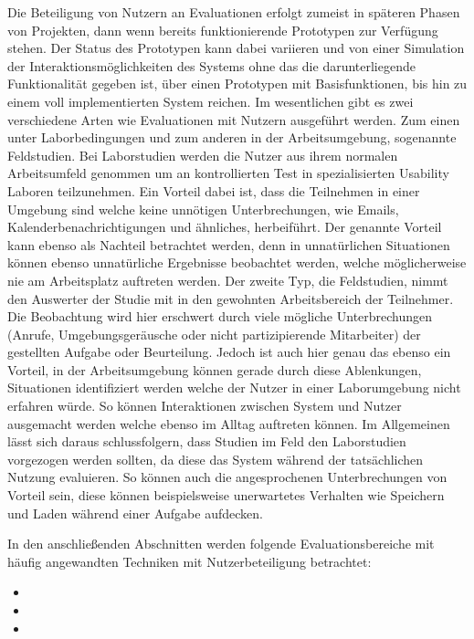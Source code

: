 \documentclass[draft=false
              ,paper=a4
              ,twoside=false
              ,fontsize=11pt
              ,headsepline
              ,BCOR10mm
              ,DIV11
              ]{scrbook}
\begin{document}
Die Beteiligung von Nutzern an Evaluationen erfolgt zumeist in späteren Phasen von Projekten, dann wenn bereits funktionierende Prototypen zur Verfügung stehen. Der Status des Prototypen kann dabei variieren und von einer Simulation der Interaktionsmöglichkeiten des Systems ohne das die darunterliegende Funktionalität gegeben ist, über einen Prototypen mit Basisfunktionen, bis hin zu einem voll implementierten System reichen.
Im wesentlichen gibt es zwei verschiedene Arten wie Evaluationen mit Nutzern ausgeführt werden. Zum einen unter Laborbedingungen und zum anderen in der Arbeitsumgebung, sogenannte Feldstudien. Bei Laborstudien werden die Nutzer aus ihrem normalen Arbeitsumfeld genommen um an kontrollierten Test in spezialisierten Usability Laboren teilzunehmen. Ein Vorteil dabei ist, dass die Teilnehmen in einer Umgebung sind welche keine unnötigen Unterbrechungen, wie Emails, Kalenderbenachrichtigungen und ähnliches, herbeiführt. Der genannte Vorteil kann ebenso als Nachteil betrachtet werden, denn in unnatürlichen Situationen können ebenso unnatürliche Ergebnisse beobachtet werden, welche möglicherweise nie am Arbeitsplatz auftreten werden.
Der zweite Typ, die Feldstudien, nimmt den Auswerter der Studie mit in den gewohnten Arbeitsbereich der Teilnehmer. Die Beobachtung wird hier erschwert durch viele mögliche Unterbrechungen (Anrufe, Umgebungsgeräusche oder nicht partizipierende Mitarbeiter) der gestellten Aufgabe oder Beurteilung. Jedoch ist auch hier genau das ebenso ein Vorteil, in der Arbeitsumgebung können gerade durch diese Ablenkungen, Situationen identifiziert werden welche der Nutzer in einer Laborumgebung nicht erfahren würde. So können Interaktionen zwischen System und Nutzer ausgemacht werden welche ebenso im Alltag auftreten können. 
Im Allgemeinen lässt sich daraus schlussfolgern, dass Studien im Feld den Laborstudien vorgezogen werden sollten, da diese das System während der tatsächlichen Nutzung evaluieren. So können auch die angesprochenen Unterbrechungen von Vorteil sein, diese können beispielsweise unerwartetes Verhalten wie Speichern und Laden während einer Aufgabe aufdecken. 

In den anschließenden Abschnitten werden folgende Evaluationsbereiche mit häufig angewandten Techniken mit Nutzerbeteiligung betrachtet:

\begin{itemize}
  \item {}
  \item {}
  \item {}
\end{itemize}
\end{document}
